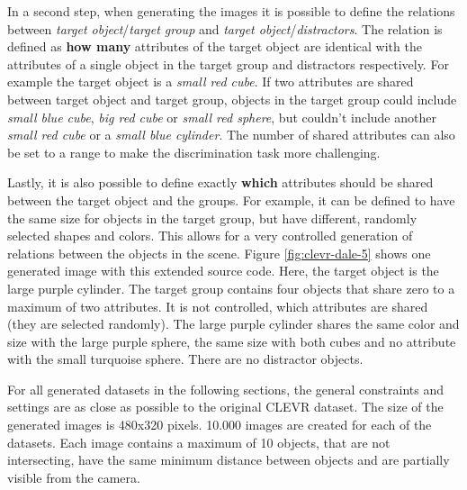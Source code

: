 In a second step, when generating the images it is possible to define the relations between \emph{target object}/\emph{target group} and \emph{target object}/\emph{distractors}.
The relation is defined as \textbf{how many} attributes of the target object are identical with the attributes of a single object in the target group and distractors respectively.
For example the target object is a \emph{small red cube}.
If two attributes are shared between target object and target group, objects in the target group could include \emph{small blue cube}, \emph{big red cube} or \emph{small red sphere}, but couldn't include another \emph{small red cube} or a \emph{small blue cylinder}.
The number of shared attributes can also be set to a range to make the discrimination task more challenging.

Lastly, it is also possible to define exactly \textbf{which} attributes should be shared between the target object and the groups.
For example, it can be defined to have the same size for objects in the target group, but have different, randomly selected shapes and colors.
This allows for a very controlled generation of relations between the objects in the scene.
Figure \ref{fig:clevr-dale-5} shows one generated image with this extended source code.
Here, the target object is the large purple cylinder.
The target group contains four objects that share zero to a maximum of two attributes.
It is not controlled, which attributes are shared (they are selected randomly). The large purple cylinder shares the same color and size with the large purple sphere, the same size with both cubes and no attribute with the small turquoise sphere.
There are no distractor objects.

For all generated datasets in the following sections, the general constraints and settings are as close as possible to the original CLEVR dataset.
The size of the generated images is 480x320 pixels.
10.000 images are created for each of the datasets.
Each image contains a maximum of 10 objects, that are not intersecting, have the same minimum distance between objects and are partially visible from the camera.

